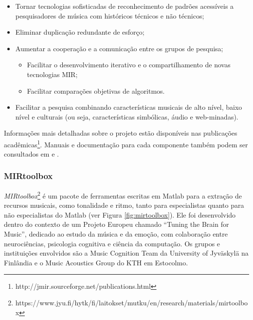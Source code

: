 \begin{itemize}
    \item Tornar tecnologias sofisticadas de reconhecimento de padrões acessíveis a pesquisadores de música com históricos técnicos e não técnicos;
    \item Eliminar duplicação redundante de esforço;
    \item Aumentar a cooperação e a comunicação entre os grupos de pesquisa;
    \begin{itemize}
        \item Facilitar o desenvolvimento iterativo e o compartilhamento de novas tecnologias MIR;
        \item Facilitar comparações objetivas de algoritmos.
    \end{itemize}
    \item Facilitar a pesquisa combinando características musicais de alto nível, baixo nível e culturais (ou seja, características simbólicas, áudio e web-minadas).
\end{itemize}

Informações mais detalhadas sobre o projeto estão disponíveis nas publicações acadêmicas\footnote{http://jmir.sourceforge.net/publications.html}. Manuais e documentação para cada componente também podem ser consultados em \cite{jmir} e \cite{mckay2010}.


\subsubsection{MIRtoolbox} \label{subsec:mirtoolbox}
\textit{MIRtoolbox}\footnote{https://www.jyu.fi/hytk/fi/laitokset/mutku/en/research/materials/mirtoolbox} é um pacote de ferramentas escritas em Matlab para a extração de recursos musicais, como tonalidade e ritmo, tanto para especialistas quanto para não especialistas do Matlab (ver Figura \ref{fig:mirtoolbox}). Ele foi desenvolvido dentro do contexto de um Projeto Europeu chamado “Tuning the Brain for Music”, dedicado ao estudo da música e da emoção, com colaboração entre neurociências, psicologia cognitiva e ciência da computação. Os grupos e instituições envolvidos são a Music Cognition Team da University of Jyväskylä na Finlândia e o Music Acoustics Group do KTH em Estocolmo.

